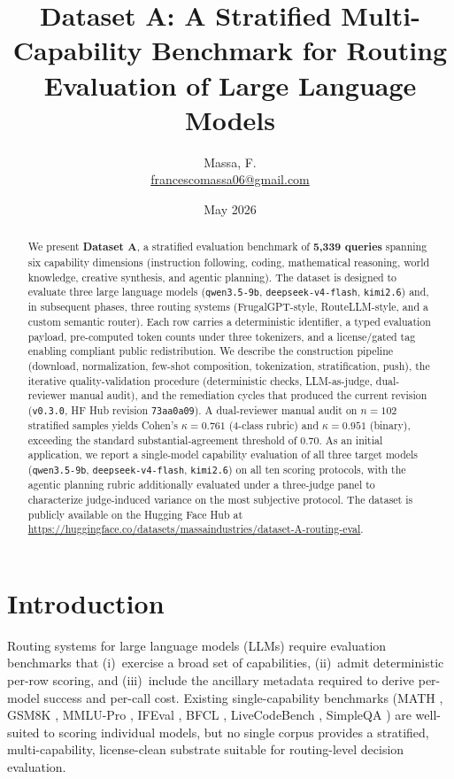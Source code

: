 \documentclass[11pt,a4paper]{article}
\title{Dataset A: A Stratified Multi-Capability Benchmark for Routing Evaluation of Large Language Models}
\author{Massa, F.\\\small{\href{mailto:francescomassa06@gmail.com}{francescomassa06@gmail.com}}}
\date{May 2026}
\begin{document}
\maketitle

\begin{abstract}
We present \textbf{Dataset A}, a stratified evaluation benchmark of \textbf{5{,}339 queries} spanning six capability dimensions (instruction following, coding, mathematical reasoning, world knowledge, creative synthesis, and agentic planning). The dataset is designed to evaluate three large language models (\texttt{qwen3.5-9b}, \texttt{deepseek-v4-flash}, \texttt{kimi2.6}) and, in subsequent phases, three routing systems (FrugalGPT-style, RouteLLM-style, and a custom semantic router). Each row carries a deterministic identifier, a typed evaluation payload, pre-computed token counts under three tokenizers, and a license/gated tag enabling compliant public redistribution. We describe the construction pipeline (download, normalization, few-shot composition, tokenization, stratification, push), the iterative quality-validation procedure (deterministic checks, LLM-as-judge, dual-reviewer manual audit), and the remediation cycles that produced the current revision (\texttt{v0.3.0}, HF Hub revision \texttt{73aa0a09}). A dual-reviewer manual audit on $n=102$ stratified samples yields Cohen's $\kappa=0.761$ (4-class rubric) and $\kappa=0.951$ (binary), exceeding the standard substantial-agreement threshold of $0.70$. As an initial application, we report a single-model capability evaluation of all three target models (\texttt{qwen3.5-9b}, \texttt{deepseek-v4-flash}, \texttt{kimi2.6}) on all ten scoring protocols, with the agentic planning rubric additionally evaluated under a three-judge panel to characterize judge-induced variance on the most subjective protocol. The dataset is publicly available on the Hugging Face Hub at \url{https://huggingface.co/datasets/massaindustries/dataset-A-routing-eval}.
\end{abstract}

\section{Introduction}

Routing systems for large language models (LLMs) require evaluation benchmarks that (i)~exercise a broad set of capabilities, (ii)~admit deterministic per-row scoring, and (iii)~include the ancillary metadata required to derive per-model success and per-call cost. Existing single-capability benchmarks (MATH \cite{hendrycks2021math}, GSM8K \cite{cobbe2021gsm8k}, MMLU-Pro \cite{wang2024mmlupro}, IFEval \cite{zhou2023ifeval}, BFCL \cite{yan2024bfcl}, LiveCodeBench \cite{jain2024livecodebench}, SimpleQA \cite{wei2024simpleqa}) are well-suited to scoring individual models, but no single corpus provides a stratified, multi-capability, license-clean substrate suitable for routing-level decision evaluation.
\end{document}
